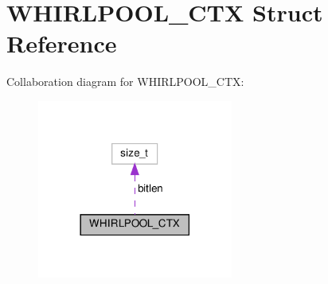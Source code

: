\hypertarget{structWHIRLPOOL__CTX}{}\section{W\+H\+I\+R\+L\+P\+O\+O\+L\+\_\+\+C\+TX Struct Reference}
\label{structWHIRLPOOL__CTX}


Collaboration diagram for W\+H\+I\+R\+L\+P\+O\+O\+L\+\_\+\+C\+TX\+:
\nopagebreak
\begin{figure}[H]
\begin{center}
\leavevmode
\includegraphics[width=182pt]{structWHIRLPOOL__CTX__coll__graph}
\end{center}
\end{figure}
